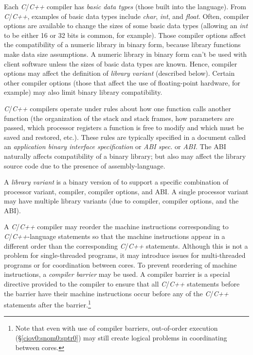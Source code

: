 Each \emph{C}/\emph{C++} compiler has \emph{basic data types} (those built into the 
language).  From \emph{C}/\emph{C++}, examples of basic data 
types include \emph{char}, \emph{int}, and \emph{float}.  
Often, compiler options are available to change the sizes of 
some basic data types (allowing an \emph{int} to be either 
16 or 32 bits is common, for example).  Those compiler 
options affect the compatibility of a numeric library in 
binary form, because library functions make data size 
assumptions.  A numeric library in binary form can't be used 
with client software unless the sizes of basic data types 
are known.  Hence, compiler options may affect the 
definition of \emph{library variant} (described below).  
Certain other compiler options (those that affect the use of 
floating-point hardware, for example) may also limit binary 
library compatibility.  

\emph{C}/\emph{C++} compilers operate under rules about how 
one function calls another function (the organization of the 
stack and stack frames, how parameters are passed, which 
processor registers a function is free to modify and which 
must be saved and restored, etc.).  These rules are 
typically specified in a document called an 
\emph{application binary 
interface specification} or \emph{ABI spec.} or 
\emph{ABI}\@.  The ABI naturally affects compatibility of a 
binary library; but also may affect the library source code 
due to the presence of assembly-language.  

A \emph{library variant} is a binary 
version of \emph{\productbasenameshort{}} to support a 
specific combination of processor variant, compiler, 
compiler options, and ABI\@.  A single processor variant may 
have multiple library variants (due to compiler, compiler 
options, and the ABI).  

A \emph{C}/\emph{C++} compiler may reorder the machine 
instructions corresponding to \emph{C}/\emph{C++}-language 
statements so that the machine instructions appear in a 
different order than the corresponding \emph{C}/\emph{C++} 
statements.  Although this is not a problem for 
single-threaded programs, it may introduce issues for 
multi-threaded programs or for coordination between cores.  
To prevent reordering of machine instructions, a 
\emph{compiler barrier} may be used.  
A compiler barrier is a special directive provided to the 
compiler to ensure that all \emph{C}/\emph{C++} statements 
before the barrier have their machine instructions occur 
before any of the \emph{C}/\emph{C++} statements after the 
barrier.\footnote{Note that even with use of compiler 
barriers, out-of-order execution 
(\S{}\ref{ciov0:snom0:sptr0}) may still create logical 
problems in coordinating between cores.} 



